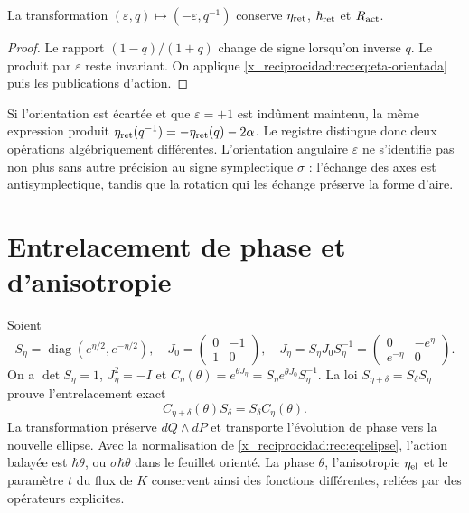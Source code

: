 \begin{corollary}
La transformation \((\varepsilon,q)\mapsto(-\varepsilon,q^{-1})\) conserve \(\eta_{\rm ret}\), \(\hbar_{\rm ret}\) et \(R_{\rm act}\).
\end{corollary}
\begin{proof}
Le rapport \((1-q)/(1+q)\) change de signe lorsqu’on inverse \(q\). Le produit par \(\varepsilon\) reste invariant. On applique \eqref{x_reciprocidad:rec:eq:eta-orientada} puis les publications d’action.
\end{proof}

Si l’orientation est écartée et que \(\varepsilon=+1\) est indûment maintenu, la même expression produit \(\eta_{\rm ret}(q^{-1})=-\eta_{\rm ret}(q)-2\alpha\). Le registre distingue donc deux opérations algébriquement différentes. L’orientation angulaire \(\varepsilon\) ne s’identifie pas non plus sans autre précision au signe symplectique \(\sigma\) : l’échange des axes est antisymplectique, tandis que la rotation qui les échange préserve la forme d’aire.

\section{Entrelacement de phase et d'anisotropie}

Soient
\[
 S_\eta=\operatorname{diag}(e^{\eta/2},e^{-\eta/2}),\quad
 J_0=\begin{pmatrix}0&-1\\1&0\end{pmatrix},\quad
 J_\eta=S_\eta J_0S_\eta^{-1}
       =\begin{pmatrix}0&-e^\eta\\e^{-\eta}&0\end{pmatrix}.
\]
On a \(\det S_\eta=1\), \(J_\eta^2=-I\) et \(C_\eta(\theta)=e^{\theta J_\eta}=S_\eta e^{\theta J_0}S_\eta^{-1}\). La loi \(S_{\eta+\delta}=S_\delta S_\eta\) prouve l'entrelacement exact
\begin{equation}
 C_{\eta+\delta}(\theta)S_\delta=S_\delta C_\eta(\theta).
 \label{x_reciprocidad:rec:eq:entrelazamiento}
\end{equation}
La transformation préserve \(dQ\wedge dP\) et transporte l’évolution de phase vers la nouvelle ellipse. Avec la normalisation de \eqref{x_reciprocidad:rec:eq:elipse}, l’action balayée est \(\hbar\theta\), ou \(\sigma\hbar\theta\) dans le feuillet orienté. La phase \(\theta\), l’anisotropie \(\eta_{\rm el}\) et le paramètre \(t\) du flux de \(K\) conservent ainsi des fonctions différentes, reliées par des opérateurs explicites.

